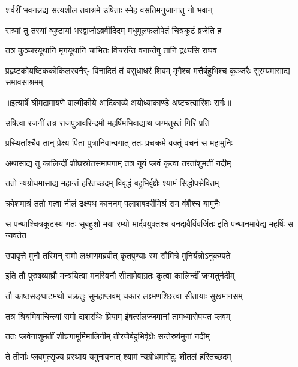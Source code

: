 \twolineshloka
{शर्वरीं भवनन्नद्य सत्यशील तवाश्रमे}
{उषिताः स्मेह वसतिमनुजानातु नो भवान्} %

\twolineshloka
{रात्र्यां तु तस्यां व्युष्टायां भरद्वाजोऽब्रवीदिदम्}
{मधुमूलफलोपेतं चित्रकूटं व्रजेति ह} %

\twolineshloka
{तत्र कुञ्जरयूथानि मृगयूथानि चाभितः}
{विचरन्ति वनान्तेषु तानि द्रक्ष्यसि राघव} %

\fourlineindentedshloka
{प्रहृष्टकोयष्टिककोकिलस्वनैर्-}
{विनादितं तं वसुधाधरं शिवम्}
{मृगैश्च मत्तैर्बहुभिश्च कुञ्जरैः}
{सुरम्यमासाद्य समावसाश्रमम्} %


{॥इत्यार्षे श्रीमद्रामायणे वाल्मीकीये आदिकाव्ये अयोध्याकाण्डे अष्टचत्वारिंशः सर्गः॥}


\twolineshloka
{उषित्वा रजनीं तत्र राजपुत्रावरिन्दमौ}
{महर्षिमभिवाद्याथ जग्मतुस्तं गिरिं प्रति} %

\twolineshloka
{प्रस्थितांश्चैव तान् प्रेक्ष्य पिता पुत्रानिवान्वगात्}
{ततः प्रचक्रमे वक्तुं वचनं स महामुनिः} %

\twolineshloka
{अथासाद्य तु कालिन्दीं शीघ्रस्रोतसमापगाम्}
{तत्र यूयं प्लवं कृत्वा तरतांशुमतीं नदीम्} %

\twolineshloka
{ततो न्यग्रोधमासाद्य महान्तं हरितच्छदम्}
{विवृद्धं बहुभिर्वृक्षैः श्यामं सिद्धोपसेवितम्} %

\twolineshloka
{क्रोशमात्रं ततो गत्वा नीलं द्रक्ष्यथ काननम्}
{पलाशबदरीमिश्रं राम वंशैश्च यामुनैः} %

\threelineshloka
{स पन्थाश्चित्रकूटस्य गतः सुबहुशो मया}
{रम्यो मार्दवयुक्तश्च वनदावैर्विवर्जितः}
{इति पन्थानमावेद्य महर्षिः स न्यवर्तत} %

\twolineshloka
{उपावृत्ते मुनौ तस्मिन् रामो लक्ष्मणमब्रवीत्}
{कृतपुण्याः स्म सौमित्रे मुनिर्यन्नोऽनुकम्पते} %

\twolineshloka
{इति तौ पुरुषव्याघ्रौ मन्त्रयित्वा मनस्विनौ}
{सीतामेवाग्रतः कृत्वा कालिन्दीं जग्मतुर्नदीम्} %

\twolineshloka
{तौ काष्ठसङ्घाटमथो चक्रतुः सुमहाप्लवम्}
{चकार लक्ष्मणश्छित्त्वा सीतायाः सुखमानसम्} %

\twolineshloka
{तत्र श्रियमिवाचिन्त्यां रामो दाशरथिः प्रियाम्}
{ईषत्संलज्जमानां तामध्यारोपयत प्लवम्} %

\twolineshloka
{ततः प्लवेनांशुमतीं शीघ्रगामूर्मिमालिनीम्}
{तीरजैर्बहुभिर्वृक्षैः सन्तेरुर्यमुनां नदीम्} %

\twolineshloka
{ते तीर्णाः प्लवमुत्सृज्य प्रस्थाय यमुनावनात्}
{श्यामं न्यग्रोधमासेदुः शीतलं हरितच्छदम्} %

